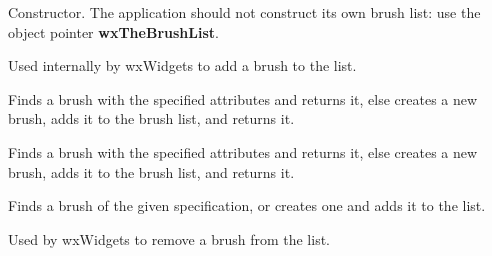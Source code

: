 Constructor. The application should not construct its own brush list:
use the object pointer {\bf wxTheBrushList}.

\label{wxbrushlistaddbrush}


Used internally by wxWidgets to add a brush to the list.

\label{wxbrushlistfindorcreatebrush}


Finds a brush with the specified attributes and returns it, else creates a new brush, adds it
to the brush list, and returns it.


Finds a brush with the specified attributes and returns it, else creates a new brush, adds it
to the brush list, and returns it.

Finds a brush of the given specification, or creates one and adds it to the list.





\label{wxbrushlistremovebrush}


Used by wxWidgets to remove a brush from the list.


